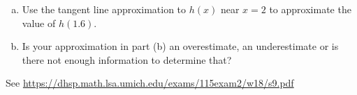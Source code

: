 \documentclass[11pt]{exam}
\begin{document}
\begin{questions}
\begin{enumerate}[(a)]
\vspace{0.2in}
\item Use the tangent line approximation to $h(x)$ near $x = 2$ to approximate the value of $h(1.6)$.
\vspace{0.2in}
\item Is your approximation in part (b) an overestimate, an underestimate or is there not enough information to determine that?
\end{enumerate}
\begin{solution}
  See \href{https://dhsp.math.lsa.umich.edu/exams/115exam2/w18/s9.pdf}{https://dhsp.math.lsa.umich.edu/exams/115exam2/w18/s9.pdf}
\end{solution}
\end{questions}
\end{document}
